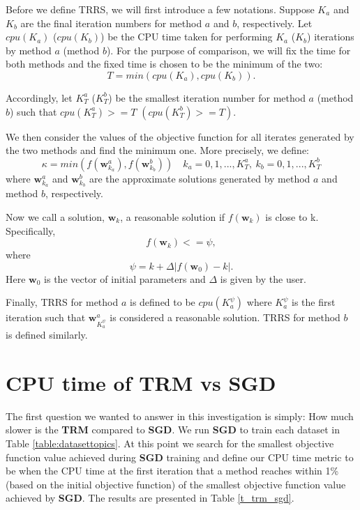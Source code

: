 \documentclass[letterpaper,12pt,titlepage,oneside,final]{book}
\begin{document}
	Before we define TRRS, we will first introduce a few notations. Suppose $K_{a}$ and $K_{b}$ are the final iteration numbers for method $a$ and $b$, respectively. Let $cpu(K_{a})$ ($cpu(K_{b})$) be the CPU time taken for performing $K_{a}$ ($K_{b}$) iterations by method $a$ (method $b$). For the purpose of comparison, we will fix the time for both methods and the fixed time is chosen to be the minimum of the two:
	\begin{equation}
	T = min(cpu(K_{a}), cpu(K_{b})).
	\end{equation}
	
	Accordingly, let $K_{T}^{a}$ ($K_{T}^{b}$) be the smallest iteration number for method $a$ (method $b$) such that $cpu(K_{T}^{a}) >= T$ $(cpu(K_{T}^{b}) >= T)$. 
	
	We then consider the values of the objective function for all iterates generated by the two methods and find the minimum one. More precisely, we define:
	\begin{equation}
	\kappa = min(f(\mathbf{w}_{k_{a}}^a), f(\mathbf{w}_{k_{b}}^b))       \quad k_{a} = 0, 1, ..., K_{T}^{a}, \  k_{b} = 0, 1, ..., K_{T}^{b}
	\end{equation}
	where $\mathbf{w}_{k_{a}}^{a}$ and $\mathbf{w}_{k_{b}}^{b}$ are the approximate solutions generated by method $a$ and method $b$, respectively.
	
	Now we call a solution, $\mathbf{w}_{k}$, a reasonable solution if $f(\mathbf{w}_{k})$ is close to k. Specifically,
	\begin{equation}
	f(\mathbf{w}_{k}) <= \psi,
	\end{equation}
	where
	\begin{equation}
	\psi = k + \Delta |f(\mathbf{w}_0) - k|.
	\end{equation}	
	Here $\mathbf{w}_{0}$ is the vector of initial parameters and $\Delta$ is given by the user.
	
	Finally, TRRS for method $a$ is defined to be $cpu(K_{a}^{\psi})$ where $K_{a}^{\psi}$ is the first iteration such that $\mathbf{w}_{K_{a}^{\psi}}^a$ is considered a reasonable solution. TRRS for method $b$ is defined similarly.
		
	\section{CPU time of TRM vs SGD}
	
	The first question we wanted to answer in this investigation is simply: How much slower is the \textbf{TRM} compared to \textbf{SGD}. We run \textbf{SGD} to train each dataset in Table \ref{table:datasettopics}. At this point we search for the smallest objective function value achieved during \textbf{SGD} training and define our CPU time metric to be when the CPU time at the first iteration that a method reaches within 1\% (based on the initial objective function) of the smallest objective function value achieved by \textbf{SGD}. The results are presented in Table \ref{t_trm_sgd}. 
	
\end{document}
